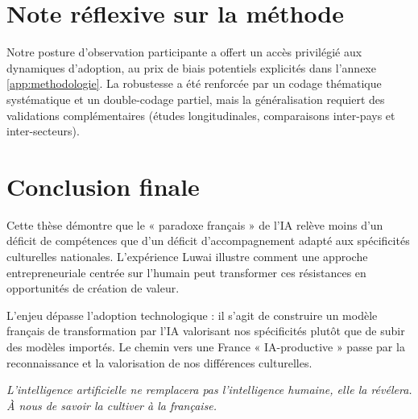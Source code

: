 \section{Note réflexive sur la méthode}
Notre posture d’observation participante a offert un accès privilégié aux dynamiques d’adoption, au prix de biais potentiels explicités dans l’annexe \ref{app:methodologie}. La robustesse a été renforcée par un codage thématique systématique et un double-codage partiel, mais la généralisation requiert des validations complémentaires (études longitudinales, comparaisons inter-pays et inter-secteurs).

\section{Conclusion finale}

Cette thèse démontre que le « paradoxe français » de l’IA relève moins d’un déficit de compétences que d’un déficit d’accompagnement adapté aux spécificités culturelles nationales. L’expérience Luwai illustre comment une approche entrepreneuriale centrée sur l’humain peut transformer ces résistances en opportunités de création de valeur.

L’enjeu dépasse l’adoption technologique : il s’agit de construire un modèle français de transformation par l’IA valorisant nos spécificités plutôt que de subir des modèles importés. Le chemin vers une France « IA-productive » passe par la reconnaissance et la valorisation de nos différences culturelles.

\emph{L’intelligence artificielle ne remplacera pas l’intelligence humaine, elle la révélera. À nous de savoir la cultiver à la française.}
